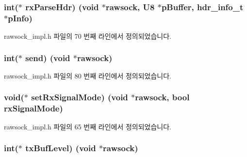 \subsubsection[{\texorpdfstring{rx\+Parse\+Hdr}{rxParseHdr}}]{\setlength{\rightskip}{0pt plus 5cm}int($\ast$ rx\+Parse\+Hdr) (void $\ast$rawsock, {\bf U8} $\ast$p\+Buffer, {\bf hdr\+\_\+info\+\_\+t} $\ast$p\+Info)}\hypertarget{structrawsock__cb__t_a21ebeb1cf85f9d386cbe5c3e9f46a1d4}{}\label{structrawsock__cb__t_a21ebeb1cf85f9d386cbe5c3e9f46a1d4}


rawsock\+\_\+impl.\+h 파일의 70 번째 라인에서 정의되었습니다.

\subsubsection[{\texorpdfstring{send}{send}}]{\setlength{\rightskip}{0pt plus 5cm}int($\ast$ send) (void $\ast$rawsock)}\hypertarget{structrawsock__cb__t_ae6202a72f83a5d92e126344ed22470a1}{}\label{structrawsock__cb__t_ae6202a72f83a5d92e126344ed22470a1}


rawsock\+\_\+impl.\+h 파일의 80 번째 라인에서 정의되었습니다.

\subsubsection[{\texorpdfstring{set\+Rx\+Signal\+Mode}{setRxSignalMode}}]{\setlength{\rightskip}{0pt plus 5cm}void($\ast$ set\+Rx\+Signal\+Mode) (void $\ast$rawsock, {\bf bool} rx\+Signal\+Mode)}\hypertarget{structrawsock__cb__t_a8140f6cfcb74252d279c85de02fa0c1a}{}\label{structrawsock__cb__t_a8140f6cfcb74252d279c85de02fa0c1a}


rawsock\+\_\+impl.\+h 파일의 65 번째 라인에서 정의되었습니다.

\subsubsection[{\texorpdfstring{tx\+Buf\+Level}{txBufLevel}}]{\setlength{\rightskip}{0pt plus 5cm}int($\ast$ tx\+Buf\+Level) (void $\ast$rawsock)}\hypertarget{structrawsock__cb__t_a3d3805c9ca1a1c658c648699ea3fdce6}{}\label{structrawsock__cb__t_a3d3805c9ca1a1c658c648699ea3fdce6}


